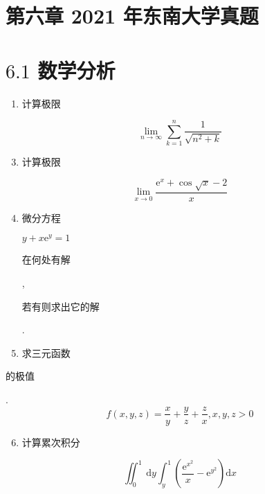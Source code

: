 \documentclass[10pt]{article}
\begin{document}
\section{第六章 2021 年东南大学真题}
\section{$6.1$ 数学分析}
\begin{enumerate}
  \item \begin{CJK}{UTF8}{mj}计算极限\end{CJK}
\end{enumerate}
$$
\lim _{n \rightarrow \infty} \sum_{k=1}^{n} \frac{1}{\sqrt{n^{2}+k}}
$$

\begin{enumerate}
  \setcounter{enumi}{2}
  \item \begin{CJK}{UTF8}{mj}计算极限\end{CJK}
\end{enumerate}
$$
\lim _{x \rightarrow 0} \frac{\mathrm{e}^{x}+\cos \sqrt{x}-2}{x}
$$

\begin{enumerate}
  \setcounter{enumi}{3}
  \item \begin{CJK}{UTF8}{mj}微分方程\end{CJK} $y+x \mathrm{e}^{y}=1$ \begin{CJK}{UTF8}{mj}在何处有解\end{CJK}, \begin{CJK}{UTF8}{mj}若有则求出它的解\end{CJK}.

  \item \begin{CJK}{UTF8}{mj}求三元函数\end{CJK}

\end{enumerate}
\begin{CJK}{UTF8}{mj}的极值\end{CJK}.
$$
f(x, y, z)=\frac{x}{y}+\frac{y}{z}+\frac{z}{x}, x, y, z>0
$$

\begin{enumerate}
  \setcounter{enumi}{5}
  \item \begin{CJK}{UTF8}{mj}计算累次积分\end{CJK}
\end{enumerate}
$$
\iint_{0}^{1} \mathrm{~d} y \int_{y}^{1}\left(\frac{\mathrm{e}^{x^{2}}}{x}-\mathrm{e}^{y^{2}}\right) \mathrm{d} x
$$
\end{document}
